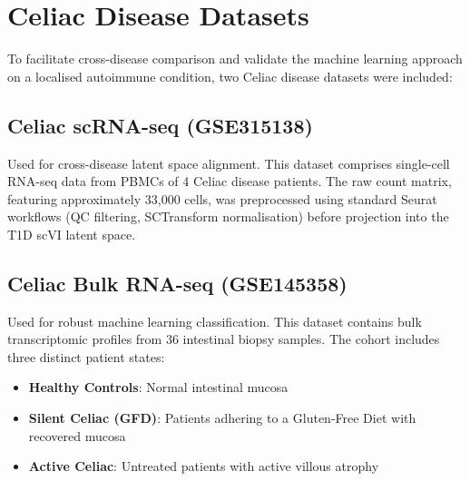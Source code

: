 \section{Celiac Disease Datasets}

To facilitate cross-disease comparison and validate the machine learning approach on a localised autoimmune condition, two Celiac disease datasets were included:

\subsection{Celiac scRNA-seq (GSE315138)}
Used for cross-disease latent space alignment. This dataset comprises single-cell RNA-seq data from PBMCs of 4 Celiac disease patients. The raw count matrix, featuring approximately 33,000 cells, was preprocessed using standard Seurat workflows (QC filtering, SCTransform normalisation) before projection into the T1D scVI latent space.

\subsection{Celiac Bulk RNA-seq (GSE145358)}
Used for robust machine learning classification. This dataset contains bulk transcriptomic profiles from 36 intestinal biopsy samples. The cohort includes three distinct patient states:
\begin{itemize}
    \item \textbf{Healthy Controls}: Normal intestinal mucosa
    \item \textbf{Silent Celiac (GFD)}: Patients adhering to a Gluten-Free Diet with recovered mucosa
    \item \textbf{Active Celiac}: Untreated patients with active villous atrophy
\end{itemize}
